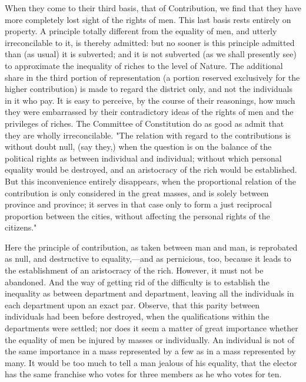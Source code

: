 When they come to their third basis, that of Contribution, we find that they have more completely lost sight of the rights of men. This last basis rests entirely on property. A principle totally different from the equality of men, and utterly irreconcilable to it, is thereby admitted: but no sooner is this principle admitted than (as usual) it is subverted; and it is not subverted (as we shall presently see) to approximate the inequality of riches to the level of Nature. The additional share in the third portion of representation (a portion reserved exclusively for the higher contribution) is made to regard the district only, and not the individuals in it who pay. It is easy to perceive, by the course of their reasonings, how much they were embarrassed by their contradictory ideas of the rights of men and the privileges of riches. The Committee of Constitution do as good as admit that they are wholly irreconcilable. "The relation with regard to the contributions is without doubt null, (say they,) when the question is on the balance of the political rights as between individual and individual; without which personal equality would be destroyed, and an aristocracy of the rich would be established. But this inconvenience entirely disappears, when the proportional relation of the contribution is only considered in the great masses, and is solely between province and province; it serves in that case only to form a just reciprocal proportion between the cities, without affecting the personal rights of the citizens."

Here the principle of contribution, as taken between man and man, is reprobated as null, and destructive to equality,—and as pernicious, too, because it leads to the establishment of an aristocracy of the rich. However, it must not be abandoned. And the way of getting rid of the difficulty is to establish the inequality as between department and department, leaving all the individuals in each department upon an exact par. Observe, that this parity between individuals had been before destroyed, when the qualifications within the departments were settled; nor does it seem a matter of great importance whether the equality of men be injured by masses or individually. An individual is not of the same importance in a mass represented by a few as in a mass represented by many. It would be too much to tell a man jealous of his equality, that the elector has the same franchise who votes for three members as he who votes for ten.

